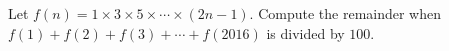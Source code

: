 Let $f(n)=1 \times 3 \times 5 \times \cdots \times (2n-1)$. Compute the remainder when $f(1)+f(2)+f(3)+\cdots +f(2016)$ is divided by $100.$
